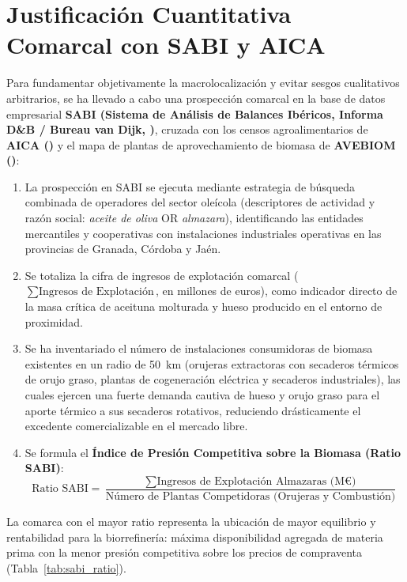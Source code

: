 \documentclass{report}
\begin{document}
\section{Justificación Cuantitativa Comarcal con SABI y AICA}
Para fundamentar objetivamente la macrolocalización y evitar sesgos cualitativos arbitrarios, se ha llevado a cabo una prospección comarcal en la base de datos empresarial \textbf{SABI (Sistema de Análisis de Balances Ibéricos, Informa D\&B / Bureau van Dijk, \autocite{SABI2026})}, cruzada con los censos agroalimentarios de \textbf{AICA (\autocite{AICA2026})} y el mapa de plantas de aprovechamiento de biomasa de \textbf{AVEBIOM (\autocite{AVEBIOM2026})}:
\begin{enumerate}
    \item La prospección en SABI se ejecuta mediante estrategia de búsqueda combinada de operadores del sector oleícola (descriptores de actividad y razón social: \textit{aceite de oliva} OR \textit{almazara}), identificando las entidades mercantiles y cooperativas con instalaciones industriales operativas en las provincias de Granada, Córdoba y Jaén.
    \item Se totaliza la cifra de ingresos de explotación comarcal ($\sum \text{Ingresos de Explotación}$, en millones de euros), como indicador directo de la masa crítica de aceituna molturada y hueso producido en el entorno de proximidad.
    \item Se ha inventariado el número de instalaciones consumidoras de biomasa existentes en un radio de \SI{50}{\kilo\metre} (orujeras extractoras con secaderos térmicos de orujo graso, plantas de cogeneración eléctrica y secaderos industriales), las cuales ejercen una fuerte demanda cautiva de hueso y orujo graso para el aporte térmico a sus secaderos rotativos, reduciendo drásticamente el excedente comercializable en el mercado libre.
    \item Se formula el \textbf{Índice de Presión Competitiva sobre la Biomasa (Ratio SABI)}:
          \begin{equation}
              \text{Ratio SABI} = \frac{\sum \text{Ingresos de Explotación Almazaras (M€)}}{\text{Número de Plantas Competidoras (Orujeras y Combustión)}}
          \end{equation}
\end{enumerate}
La comarca con el mayor ratio representa la ubicación de mayor equilibrio y rentabilidad para la biorrefinería: máxima disponibilidad agregada de materia prima con la menor presión competitiva sobre los precios de compraventa (Tabla~\ref{tab:sabi_ratio}).
\end{document}
